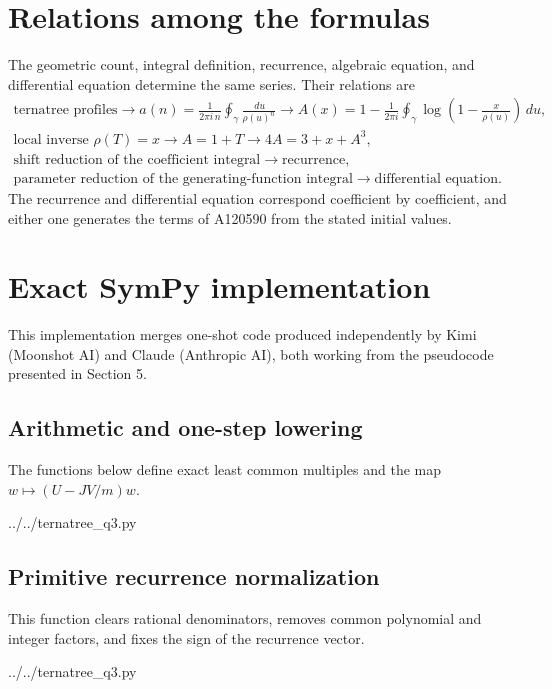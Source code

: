 \documentclass[11pt,fleqn]{article}
\theoremstyle{plain}
\newcommand{\dd}{\,d}
\begin{document}
\clearpage
\section{Relations among the formulas}

The geometric count, integral definition, recurrence, algebraic equation, and
differential equation determine the same series.  Their relations are
\[
\begin{array}{c}
\text{ternatree profiles}
\longrightarrow
\displaystyle a(n)=\frac{1}{2\pi i\,n}\oint_\gamma\frac{\dd u}{\rho(u)^n}
\longrightarrow
\displaystyle A(x)=1-\frac{1}{2\pi i}\oint_\gamma
\log\!\left(1-\frac{x}{\rho(u)}\right)\dd u,\\[1.1em]
\text{local inverse }\rho(T)=x
\longrightarrow
A=1+T
\longrightarrow
4A=3+x+A^3,\\[1.1em]
\text{shift reduction of the coefficient integral}
\longrightarrow
\text{recurrence},\\[0.6em]
\text{parameter reduction of the generating-function integral}
\longrightarrow
\text{differential equation}.
\end{array}
\]
The recurrence and differential equation correspond coefficient by
coefficient, and either one generates the terms of A120590 from the stated
initial values.

\appendix
\section{Exact SymPy implementation}

This implementation merges one-shot code produced independently by Kimi (Moonshot AI) and Claude (Anthropic AI), both working from the pseudocode presented in Section 5.

\subsection{Arithmetic and one-step lowering}
The functions below define exact least common multiples and the map
$w\mapsto (U-JV/m)w$.
\par\medskip\noindent
\begin{minipage}[t]{\textwidth}

{../../ternatree_q3.py}
\end{minipage}

\clearpage
\subsection{Primitive recurrence normalization}
This function clears rational denominators, removes common polynomial and
integer factors, and fixes the sign of the recurrence vector.
\par\medskip\noindent
\begin{minipage}[t]{\textwidth}

{../../ternatree_q3.py}
\end{minipage}
\end{document}
